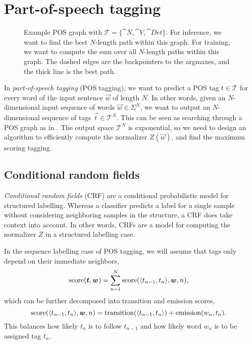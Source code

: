 \section{Part-of-speech tagging} \label{sec:pos-tagging}

\begin{figure}[ht]
    \centering
    \caption{Example POS graph with $\mathcal{T} = \{ \cat{N}, \cat{V},
    \cat{Det} \}$. For inference, we want to find the best $N$-length path
    within this graph. For training, we want to compute the sum over all
    $N$-length paths within this graph. The dashed edges are the backpointers to
    the argmaxes, and the thick line is the best path.}
    \label{fig:pos-graph}
\end{figure}

In \textit{part-of-speech tagging} (POS tagging), we want to predict a POS tag
$t\in\mathcal{T}$ for every word of the input sentence $\vec{w}$ of length $N$.
In other words, given an $N$-dimensional input sequence of words $\vec{w} \in
\Sigma^N$, we want to output an $N$-dimensional sequence of tags $\vec{t} \in
\mathcal{T}^N$. This can be seen as searching through a POS graph as in
. The output space $\mathcal{T}^N$ is exponential, so we
need to design an algorithm to efficiently compute the normalizer $Z(\vec{w})$,
and find the maximum scoring tagging.

\subsection{Conditional random fields}

\textit{Conditional random fields} (CRF) are a conditional probabilistic model
for structured labelling. Whereas a classifier predicts a label for a single
sample without considering neighboring samples in the structure, a CRF does
take context into account. In other words, CRFs are a model for computing the
normalizer $Z$ in a structured labelling case.

In the sequence labelling case of POS tagging, we will assume that tags only
depend on their immediate neighbors, \[
  \mathrm{score}(\bm{t},\bm{w}) = \sum_{n=1}^N \mathrm{score}(\langle t_{n-1},t_n \rangle, \bm{w}, n)
,\]
which can be further decomposed into transition and emission scores, \[
  \mathrm{score}(\langle t_{n-1},t_n \rangle, \bm{w}, n) = \mathrm{transition}(\langle t_{n-1},t_n \rangle) + \mathrm{emission}(w_n, t_n)
.\]
This balances how likely $t_n$ is to follow $t_{n-1}$ and how likely word $w_n$
is to be assigned tag $t_n$.


